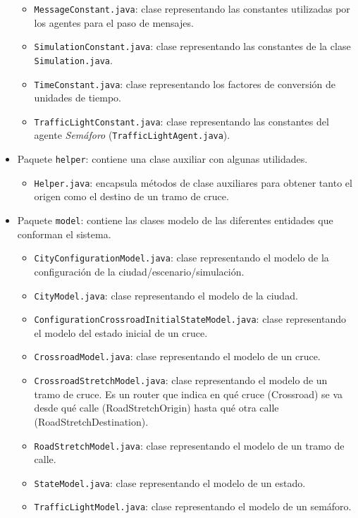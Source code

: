 \begin{itemize}
\begin{itemize}
        \item \lstinline{MessageConstant.java}: clase representando las constantes utilizadas por los agentes para el paso de mensajes.
        \item \lstinline{SimulationConstant.java}: clase representando las constantes de la clase \lstinline{Simulation.java}.
        \item \lstinline{TimeConstant.java}: clase representando los factores de conversión de unidades de tiempo.
        \item \lstinline{TrafficLightConstant.java}: clase representando las constantes del agente \textit{Semáforo} (\lstinline{TrafficLightAgent.java}).
    \end{itemize}
    \item Paquete \lstinline{helper}: contiene una clase auxiliar con algunas utilidades.
    \begin{itemize}
        \item \lstinline{Helper.java}: encapsula métodos de clase auxiliares para obtener tanto el origen como el destino de un tramo de cruce.
    \end{itemize}
    \item Paquete \lstinline{model}: contiene las clases modelo de las diferentes entidades que conforman el sistema.
    \begin{itemize}
        \item \lstinline{CityConfigurationModel.java}: clase representando el modelo de la configuración de la ciudad/escenario/simulación.
        \item \lstinline{CityModel.java}: clase representando el modelo de la ciudad.
        \item \lstinline{ConfigurationCrossroadInitialStateModel.java}: clase representando el modelo del estado inicial de un cruce.
        \item \lstinline{CrossroadModel.java}: clase representando el modelo de un cruce.
        \item \lstinline{CrossroadStretchModel.java}: clase representando el modelo de un tramo de cruce. Es un router que indica en qué cruce (Crossroad) se va desde qué calle (RoadStretchOrigin) hasta qué otra calle (RoadStretchDestination).
        \item \lstinline{RoadStretchModel.java}: clase representando el modelo de un tramo de calle.
        \item \lstinline{StateModel.java}: clase representando el modelo de un estado.
        \item \lstinline{TrafficLightModel.java}: clase representando el modelo de un semáforo.

\end{itemize}
\end{itemize}
